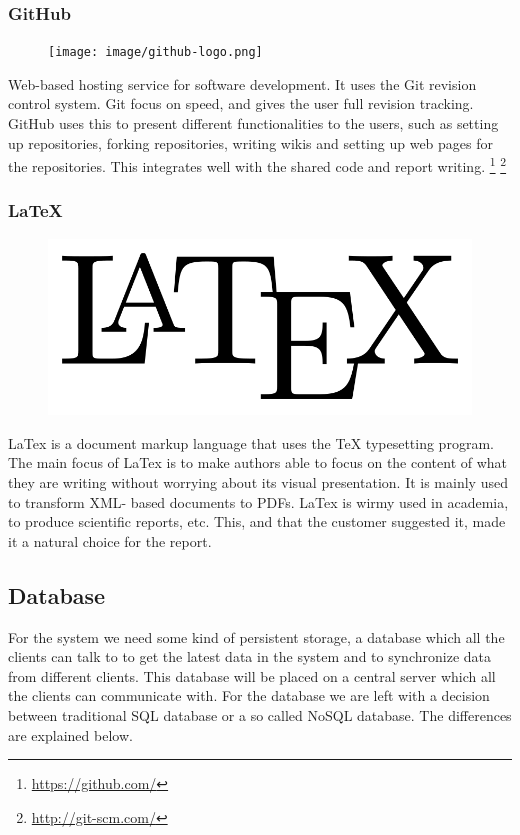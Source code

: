 \subsubsection{GitHub} \label{GitHub}

\begin{figure}
\vspace{-30pt}
\centering
\texttt{[image: image/github-logo.png]}
\end{figure}

Web-based hosting service for software development. It uses the Git revision control system. Git focus on speed, and gives the user full revision tracking. GitHub uses this to present different functionalities to the users, such as setting up repositories, forking repositories, writing wikis and setting up web pages for the repositories. This integrates well with the shared code and report writing.
\footnote{\url{https://github.com/}}
\footnote{\url{http://git-scm.com/}}

\subsubsection{LaTeX}

\begin{figure}
\vspace{-30pt}
\centering
\includegraphics[width = .20\textwidth]{image/latex-logo.png}
\end{figure}

LaTex is a document markup language that uses the TeX typesetting program. The main focus of LaTex is to make authors able to focus on the content of what they are writing without worrying about its visual presentation. It is mainly used to transform XML- based documents to PDFs. LaTex is wirmy used in academia, to produce scientific reports, etc. This, and that the customer suggested it, made it a natural choice for the report.

\subsection{Database}
For the system we need some kind of persistent storage, a database which all the clients can talk to to get the latest data in the system and to synchronize data from different clients. This database will be placed on a central server which all the clients can communicate with. For the database we are left with a decision between traditional SQL database or a so called NoSQL database. The differences are explained below.

